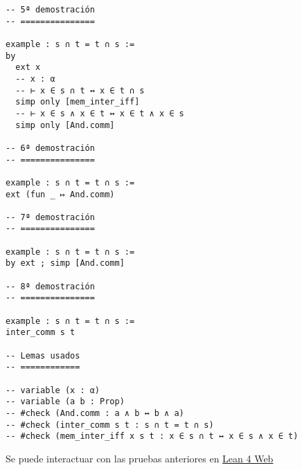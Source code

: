 \begin{verbatim}
-- 5ª demostración
-- ===============

example : s ∩ t = t ∩ s :=
by
  ext x
  -- x : α
  -- ⊢ x ∈ s ∩ t ↔ x ∈ t ∩ s
  simp only [mem_inter_iff]
  -- ⊢ x ∈ s ∧ x ∈ t ↔ x ∈ t ∧ x ∈ s
  simp only [And.comm]

-- 6ª demostración
-- ===============

example : s ∩ t = t ∩ s :=
ext (fun _ ↦ And.comm)

-- 7ª demostración
-- ===============

example : s ∩ t = t ∩ s :=
by ext ; simp [And.comm]

-- 8ª demostración
-- ===============

example : s ∩ t = t ∩ s :=
inter_comm s t

-- Lemas usados
-- ============

-- variable (x : α)
-- variable (a b : Prop)
-- #check (And.comm : a ∧ b ↔ b ∧ a)
-- #check (inter_comm s t : s ∩ t = t ∩ s)
-- #check (mem_inter_iff x s t : x ∈ s ∩ t ↔ x ∈ s ∧ x ∈ t)
\end{verbatim}
Se puede interactuar con las pruebas anteriores en \href{https://lean.math.hhu.de/\#url=https://raw.githubusercontent.com/jaalonso/Calculemus2/main/src/Conmutatividad\_de\_la\_interseccion.lean}{Lean 4 Web}

